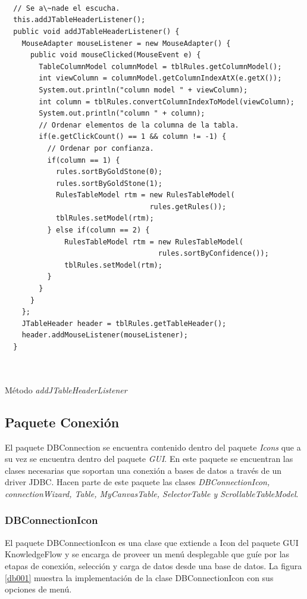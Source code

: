 \newpage
\begin{codigof}[!t]
\begin{verbatim}



  // Se a\~nade el escucha.
  this.addJTableHeaderListener();
  public void addJTableHeaderListener() {
    MouseAdapter mouseListener = new MouseAdapter() {
      public void mouseClicked(MouseEvent e) {
        TableColumnModel columnModel = tblRules.getColumnModel();
        int viewColumn = columnModel.getColumnIndexAtX(e.getX());
        System.out.println("column model " + viewColumn);
        int column = tblRules.convertColumnIndexToModel(viewColumn);
        System.out.println("column " + column);
        // Ordenar elementos de la columna de la tabla.
        if(e.getClickCount() == 1 && column != -1) {
          // Ordenar por confianza.
          if(column == 1) {
            rules.sortByGoldStone(0);
            rules.sortByGoldStone(1);
            RulesTableModel rtm = new RulesTableModel(
                                  rules.getRules());
            tblRules.setModel(rtm);
          } else if(column == 2) {
              RulesTableModel rtm = new RulesTableModel(
                                    rules.sortByConfidence());
              tblRules.setModel(rtm);
          }
        }
      }
    };
    JTableHeader header = tblRules.getTableHeader();
    header.addMouseListener(mouseListener);
  }



\end{verbatim}
\caption{M\'etodo \textit{addJTableHeaderListener}}
\end{codigof}

 \subsection{Paquete Conexi\'on}
 El paquete DBConnection se encuentra contenido dentro del paquete \textit{Icons} que a su vez se encuentra dentro
 del paquete \textit{GUI}.  En este paquete se encuentran las clases necesarias que soportan una conexi\'on a
 bases de datos a trav\'es de un driver JDBC.  Hacen parte de este paquete las clases  \textit{DBConnectionIcon,
 connectionWizard, Table, MyCanvasTable, SelectorTable y ScrollableTableModel}.\\

\subsubsection{DBConnectionIcon} 
El paquete DBConnectionIcon es una clase que extiende a Icon del paquete GUI KnowledgeFlow y se encarga de
proveer un men\'u desplegable que gu\'ie por las etapas de conexi\'on, selecci\'on y carga de datos desde una
base de datos.  La figura \ref{db001} muestra la implementaci\'on de la clase DBConnectionIcon con sus opciones
de men\'u.\\

